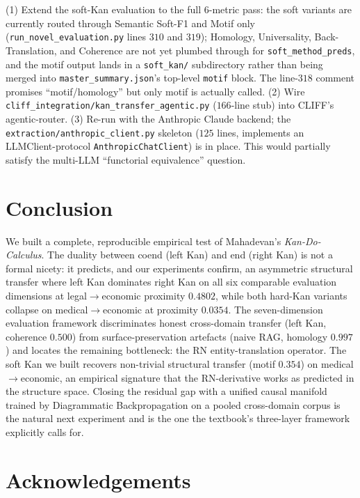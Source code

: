 \documentclass[10pt,letterpaper]{article}
\begin{document}
(1) Extend the soft-Kan evaluation to the full $6$-metric pass: the soft variants are currently routed through Semantic Soft-F1 and Motif only (\texttt{run\_novel\_evaluation.py} lines $310$ and $319$); Homology, Universality, Back-Translation, and Coherence are not yet plumbed through for \texttt{soft\_method\_preds}, and the motif output lands in a \texttt{soft\_kan/} subdirectory rather than being merged into \texttt{master\_summary.json}'s top-level \texttt{motif} block. The line-$318$ comment promises ``motif/homology'' but only motif is actually called. (2) Wire \texttt{cliff\_integration/kan\_transfer\_agentic.py} ($166$-line stub) into CLIFF's agentic-router. (3) Re-run with the Anthropic Claude backend; the \texttt{extraction/anthropic\_client.py} skeleton ($125$ lines, implements an LLMClient-protocol \texttt{AnthropicChatClient}) is in place. This would partially satisfy the multi-LLM ``functorial equivalence'' question.

\section{Conclusion}

We built a complete, reproducible empirical test of Mahadevan's \emph{Kan-Do-Calculus}. The duality between coend (left Kan) and end (right Kan) is not a formal nicety: it predicts, and our experiments confirm, an asymmetric structural transfer where left Kan dominates right Kan on all six comparable evaluation dimensions at legal${\to}$economic proximity $0.4802$, while both hard-Kan variants collapse on medical${\to}$economic at proximity $0.0354$. The seven-dimension evaluation framework discriminates honest cross-domain transfer (left Kan, coherence $0.500$) from surface-preservation artefacts (naive RAG, homology $0.997$) and locates the remaining bottleneck: the RN entity-translation operator. The soft Kan we built recovers non-trivial structural transfer (motif $0.354$) on medical${\to}$economic, an empirical signature that the RN-derivative works as predicted in the structure space. Closing the residual gap with a unified causal manifold trained by Diagrammatic Backpropagation on a pooled cross-domain corpus is the natural next experiment and is the one the textbook's three-layer framework explicitly calls for.

\section*{Acknowledgements}
\end{document}
